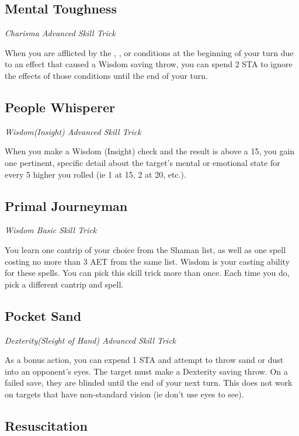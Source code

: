 \subsection{Mental Toughness}

\textit{Charisma Advanced Skill Trick}

When you are afflicted by the , , or  conditions at the beginning of your turn due to an effect that caused a Wisdom saving throw, you can spend 2 STA to ignore the effects of those conditions until the end of your turn.

\subsection{People Whisperer}

\textit{Wisdom(Insight) Advanced Skill Trick}

When you make a Wisdom (Insight) check and the result is above a 15, you gain one pertinent, specific detail about the target's mental or emotional state for every 5 higher you rolled (ie 1 at 15, 2 at 20, etc.).

\subsection{Primal Journeyman}

\textit{Wisdom Basic Skill Trick}

You learn one cantrip of your choice from the Shaman list, as well as one spell costing no more than 3 AET from the same list. Wisdom is your casting ability for these spells. You can pick this skill trick more than once. Each time you do, pick a different cantrip and spell.

\subsection{Pocket Sand}

\textit{Dexterity(Sleight of Hand) Advanced Skill Trick}

As a bonus action, you can expend 1 STA and attempt to throw sand or dust into an opponent's eyes. The target must make a Dexterity saving throw. On a failed save, they are blinded until the end of your next turn. This does not work on targets that have non-standard vision (ie don't use eyes to see).

\subsection{Resuscitation}

